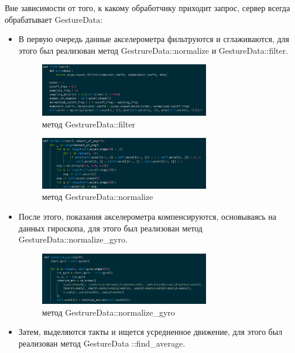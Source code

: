 Вне зависимости от того, к какому обработчику приходит запрос, сервер всегда обрабатывает GestureData:
\begin{itemize}
  \item В первую очередь данные акселерометра фильтруются и сглаживаются, для этого был реализован метод GestrureData::normalize и GestureData::filter. \newline
  \begin{figure}[H]
    \begin{center}
        \includegraphics[width=0.7\textwidth]{images/filter.png}
    \end{center}
    \caption{метод GestrureData::filter}
\end{figure}
\begin{figure}[H]
  \begin{center}
      \includegraphics[width=0.7\textwidth]{images/normalize.png}
  \end{center}
  \caption{метод GestrureData::normalize}
\end{figure}
  \item После этого, показания акселерометра компенсируются, основываясь на данных гироскопа, для этого был реализован метод GestureData::normalize\_gyro.
  \begin{figure}[H]
    \begin{center}
        \includegraphics[width=0.7\textwidth]{images/norm_gyro.png}
    \end{center}
    \caption{метод GestrureData::normalize\_gyro}
  \end{figure}
  \item Затем, выделяются такты и ищется усредненное движение, для этого был реализован метод GestureData ::find\_average.

\end{itemize}
